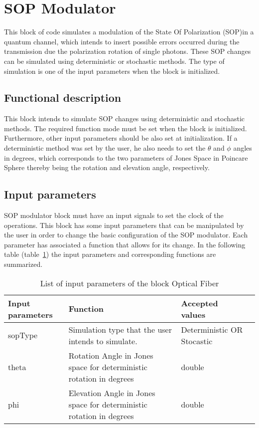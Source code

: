 \clearpage

\section{SOP Modulator}

This block of code simulates a modulation of the State Of Polarization (SOP)in a quantum channel, which intends to insert possible errors occurred during the transmission due the polarization rotation of single photons. These SOP changes can be simulated using deterministic or stochastic methods. The type of simulation is one of the input parameters when the block is initialized.


\subsection*{Functional description}

This block intends to simulate SOP changes using deterministic and stochastic methods. The required function mode must be set when the block is initialized. Furthermore, other input parameters should be also set at initialization. If a deterministic method was set by the user, he also needs to set the $\theta$ and $\phi$ angles in degrees, which corresponds to the two parameters of Jones Space in Poincare Sphere thereby being the rotation and elevation angle, respectively.


\subsection*{Input parameters}

SOP modulator block must have an input signals to set the clock of the operations. This block has some input parameters that can be manipulated by the user in order to change the basic configuration of the SOP modulator. Each parameter has associated a function that allows for its change. In the following table (table~\ref{table}) the input parameters and corresponding functions are summarized.

\begin{table}[h]
	\begin{center}
		\begin{tabular}{| m{} | m{} |  m{} | m{4cm} | }
			\hline
			\textbf{Input parameters} & \textbf{Function} & \textbf{Accepted values} \\ \hline
			sopType                   & Simulation type that the user intends to simulate. & Deterministic OR Stocastic\\
            theta                     & Rotation Angle in Jones space for deterministic rotation in degrees & double \\
            phi                       & Elevation Angle in Jones space for deterministic rotation in degrees & double \\

			\hline
		\end{tabular}
		\caption{List of input parameters of the block Optical Fiber} \label{table}
	\end{center}
\end{table}


